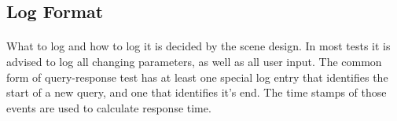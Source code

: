 \subsection{Log Format}
\paragraph{}
What to log and how to log it is decided by the scene design.
In most tests it is advised to log all changing parameters, as well as all user input.
The common form of query-response test has at least one special log entry that identifies the start of a new query, and one that identifies it's end.
The time stamps of those events are used to calculate response time.



